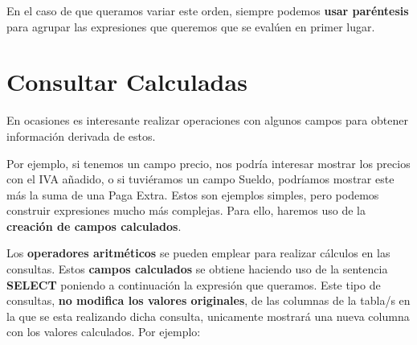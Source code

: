 En el caso de que queramos variar este orden, siempre podemos \textbf{usar paréntesis} para agrupar las expresiones que queremos que se evalúen en primer lugar.

\section{Consultar Calculadas}
En ocasiones es interesante realizar operaciones con algunos campos para obtener información derivada de estos.

Por ejemplo, si tenemos un campo precio, nos podría interesar mostrar los precios con el IVA añadido, o si tuviéramos un campo Sueldo, podríamos mostrar este más la suma de una Paga Extra. Estos son ejemplos simples, pero podemos construir expresiones mucho más complejas. 	Para ello, haremos uso de la \textbf{creación de campos calculados}.

Los \textbf{operadores aritméticos} se pueden emplear para realizar cálculos en las consultas. Estos \textbf{campos calculados} se obtiene haciendo uso de la sentencia \textbf{SELECT} poniendo a continuación la expresión que queramos. Este tipo de consultas, \textbf{no modifica los valores originales}, de las columnas de la tabla/s en la que se esta realizando dicha consulta, unicamente mostrará una nueva columna con los valores calculados. Por ejemplo:

